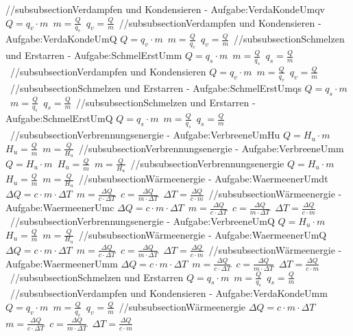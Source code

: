 //subsubsection{Verdampfen und Kondensieren - Aufgabe:VerdaKondeUmqv} 
$ Q =q_{v} \cdot m $\ 
$ m = \frac{Q}{q_{v} } $\ 
$ q_{v}  = \frac{Q}{m} $\ 
//subsubsection{Verdampfen und Kondensieren - Aufgabe:VerdaKondeUmQ} 
$ Q =q_{v} \cdot m $\ 
$ m = \frac{Q}{q_{v} } $\ 
$ q_{v}  = \frac{Q}{m} $\ 
//subsubsection{Schmelzen und Erstarren - Aufgabe:SchmelErstUmm} 
$ Q = q_{s} \cdot m $\ 
$ m = \frac{Q}{q_{s} } $\ 
$ q_{s}  = \frac{Q}{m} $\ 
//subsubsection{Verdampfen und Kondensieren} 
$ Q =q_{v} \cdot m $\ 
$ m = \frac{Q}{q_{v} } $\ 
$ q_{v}  = \frac{Q}{m} $\ 
//subsubsection{Schmelzen und Erstarren - Aufgabe:SchmelErstUmqs} 
$ Q = q_{s} \cdot m $\ 
$ m = \frac{Q}{q_{s} } $\ 
$ q_{s}  = \frac{Q}{m} $\ 
//subsubsection{Schmelzen und Erstarren - Aufgabe:SchmelErstUmQ} 
$ Q = q_{s} \cdot m $\ 
$ m = \frac{Q}{q_{s} } $\ 
$ q_{s}  = \frac{Q}{m} $\ 
//subsubsection{Verbrennungsenergie - Aufgabe:VerbreeneUmHu} 
$ Q = H_{u} \cdot m $\ 
$ H_{u}  = \frac{Q}{m} $\ 
$ m = \frac{Q}{H_{u} } $\ 
//subsubsection{Verbrennungsenergie - Aufgabe:VerbreeneUmm} 
$ Q = H_{u} \cdot m $\ 
$ H_{u}  = \frac{Q}{m} $\ 
$ m = \frac{Q}{H_{u} } $\ 
//subsubsection{Verbrennungsenergie} 
$ Q = H_{u} \cdot m $\ 
$ H_{u}  = \frac{Q}{m} $\ 
$ m = \frac{Q}{H_{u} } $\ 
//subsubsection{Wärmeenergie - Aufgabe:WaermeenerUmdt} 
$ \Delta Q = c\cdot m\cdot \Delta T $\ 
$ m = \frac{ \Delta Q}{c\cdot \Delta T} $\ 
$ c = \frac{ \Delta Q}{m\cdot \Delta T} $\ 
$ \Delta T = \frac{\Delta Q}{c\cdot m} $\ 
//subsubsection{Wärmeenergie - Aufgabe:WaermeenerUmc} 
$ \Delta Q = c\cdot m\cdot \Delta T $\ 
$ m = \frac{ \Delta Q}{c\cdot \Delta T} $\ 
$ c = \frac{ \Delta Q}{m\cdot \Delta T} $\ 
$ \Delta T = \frac{\Delta Q}{c\cdot m} $\ 
//subsubsection{Verbrennungsenergie - Aufgabe:VerbreeneUmQ} 
$ Q = H_{u} \cdot m $\ 
$ H_{u}  = \frac{Q}{m} $\ 
$ m = \frac{Q}{H_{u} } $\ 
//subsubsection{Wärmeenergie - Aufgabe:WaermeenerUmQ} 
$ \Delta Q = c\cdot m\cdot \Delta T $\ 
$ m = \frac{ \Delta Q}{c\cdot \Delta T} $\ 
$ c = \frac{ \Delta Q}{m\cdot \Delta T} $\ 
$ \Delta T = \frac{\Delta Q}{c\cdot m} $\ 
//subsubsection{Wärmeenergie - Aufgabe:WaermeenerUmm} 
$ \Delta Q = c\cdot m\cdot \Delta T $\ 
$ m = \frac{ \Delta Q}{c\cdot \Delta T} $\ 
$ c = \frac{ \Delta Q}{m\cdot \Delta T} $\ 
$ \Delta T = \frac{\Delta Q}{c\cdot m} $\ 
//subsubsection{Schmelzen und Erstarren} 
$ Q = q_{s} \cdot m $\ 
$ m = \frac{Q}{q_{s} } $\ 
$ q_{s}  = \frac{Q}{m} $\ 
//subsubsection{Verdampfen und Kondensieren - Aufgabe:VerdaKondeUmm} 
$ Q =q_{v} \cdot m $\ 
$ m = \frac{Q}{q_{v} } $\ 
$ q_{v}  = \frac{Q}{m} $\ 
//subsubsection{Wärmeenergie} 
$ \Delta Q = c\cdot m\cdot \Delta T $\ 
$ m = \frac{ \Delta Q}{c\cdot \Delta T} $\ 
$ c = \frac{ \Delta Q}{m\cdot \Delta T} $\ 
$ \Delta T = \frac{\Delta Q}{c\cdot m} $\ 
